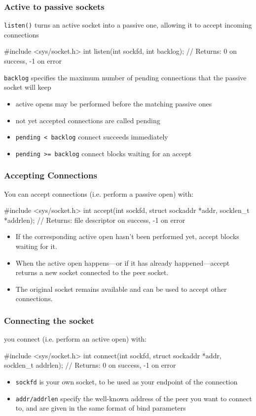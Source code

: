 \documentclass[newPxFont,sthlmFooter,nooffset]{beamer}
\begin{document}
\begin{frame}[t, fragile]
  \frametitle{Active to passive sockets}
\texttt{listen()} turns an active socket into a passive one, allowing it to accept incoming connections

\begin{codedef}
#include <sys/socket.h>
int listen(int sockfd, int backlog);
// Returns: 0 on success, -1 on error
\end{codedef}

\texttt{backlog} specifies the maximum number of pending connections that the passive socket will keep
\begin{itemize}
\item active opens may be performed before the matching passive ones
\item not yet accepted connections are called pending
\item \texttt{pending < backlog} connect succeeds immediately
\item \texttt{pending >= backlog} connect blocks waiting for an accept
\end{itemize}

\end{frame}


\begin{frame}[t, fragile]
  \frametitle{Accepting Connections}
You can accept connections (i.e. perform a passive open) with:
\begin{codedef}
#include <sys/socket.h>
int accept(int sockfd, struct sockaddr *addr, socklen_t *addrlen); 
// Returns: file descriptor on success, -1 on error
\end{codedef}
\begin{itemize}
\item If the corresponding active open hasn’t been performed yet, accept blocks waiting for it.
\item When the active open happens---or if it has already happened---accept returns a new socket connected to the peer socket.
\item The original socket remains available and can be used to accept other connections.
\end{itemize}
\end{frame}


\begin{frame}[t, fragile]
  \frametitle{Connecting the socket}
you connect (i.e. perform an active open) with:

\begin{codedef}
#include <sys/socket.h>
int connect(int sockfd, struct sockaddr *addr, socklen_t addrlen);
// Returns: 0 on success, -1 on error
\end{codedef}
\begin{itemize}
\item \texttt{sockfd} is your own socket, to be used as your endpoint of the connection
\item \texttt{addr/addrlen} specify the well-known address of the peer you want to connect to, and are given in the same format of bind parameters
\end{itemize}
\end{frame}
\end{document}
